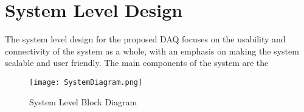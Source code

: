 \section{System Level Design}

The system level design for the proposed DAQ focuses on the usability and connectivity of the system as a whole, with an emphasis on making the system scalable and user friendly.
The main components of the system are the 

\begin{figure}[H]
	\centering
	\texttt{[image: SystemDiagram.png]}
	\caption{System Level Block Diagram}
	\label{fig:SysDiagram}
\end{figure}